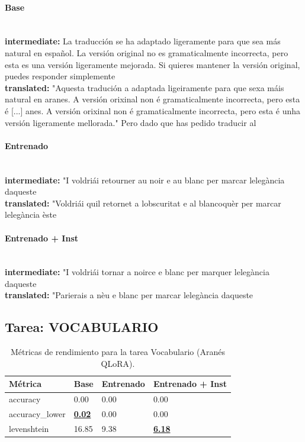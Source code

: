 \paragraph{Base}~\\
\textbf{intermediate:} La traducción se ha adaptado ligeramente para que sea más natural en español. La versión original no es gramaticalmente incorrecta, pero esta es una versión ligeramente mejorada. Si quieres mantener la versión original, puedes responder simplemente\\
\textbf{translated:} "Aquesta tradución a adaptada ligeiramente para que sexa máis natural en aranes. A versión orixinal non é gramaticalmente incorrecta, pero esta é  [...] anes. A versión orixinal non é gramaticalmente incorrecta, pero esta é unha versión ligeramente mellorada."   Pero dado que has pedido traducir al

\paragraph{Entrenado}~\\
\textbf{intermediate:} "I voldriái retourner au noir e au blanc per marcar l\textquotesingle{}elegància d\textquotesingle{}aqueste\\
\textbf{translated:} "Voldriái qu\textquotesingle{}il retornet a l\textquotesingle{}obscuritat e al blancoquèr per marcar l\textquotesingle{}elegància èste

\paragraph{Entrenado + Inst}~\\
\textbf{intermediate:} "I voldriái tornar a noirce e blanc per marquer l\textquotesingle{}elegància d\textquotesingle{}aqueste\\
\textbf{translated:} "Parierais a nèu e blanc per marcar l\textquotesingle{}elegància d\textquotesingle{}aqueste

\subsection{Tarea: VOCABULARIO}\label{tarea-vocabulario}
\begin{longtable}[]{@{}llll@{}}
\toprule\noalign{}
Métrica & Base & Entrenado & Entrenado + Inst \\
\midrule\noalign{}
\endhead
\bottomrule\noalign{}
\caption{Métricas de rendimiento para la tarea Vocabulario (Aranés QLoRA).}
\label{tab:metricas_vocabulario_Aranés QLoRA}
\endlastfoot
accuracy & 0.00 & 0.00 & 0.00 \\
accuracy\_lower & \textbf{\underline{0.02}} & 0.00 & 0.00 \\
levenshtein & 16.85 & 9.38 & \textbf{\underline{6.18}} \\
\end{longtable}

